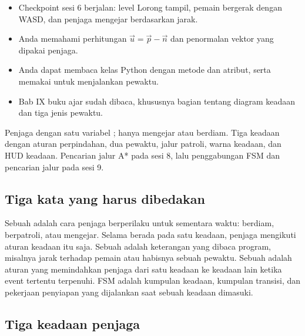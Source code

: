 
\begin{prasyaratbox}
\begin{itemize}[leftmargin=1.4em, itemsep=0.25em]
  \item Checkpoint sesi 6 berjalan: level Lorong tampil, pemain bergerak dengan
        WASD, dan penjaga mengejar berdasarkan jarak.
  \item Anda memahami perhitungan $\vec{u} = \vec{p} - \vec{n}$ dan
        penormalan vektor yang dipakai penjaga.
  \item Anda dapat membaca kelas Python dengan metode dan atribut, serta
        memakai  untuk menjalankan pewaktu.
  \item Bab IX buku ajar sudah dibaca, khususnya bagian tentang diagram
        keadaan dan tiga jenis pewaktu.
\end{itemize}
\end{prasyaratbox}


\petasesi
  {Penjaga dengan satu variabel ; hanya mengejar atau berdiam.}
  {Tiga keadaan dengan aturan perpindahan, dua pewaktu, jalur patroli, warna
   keadaan, dan HUD keadaan.}
  {Pencarian jalur A* pada sesi 8, lalu penggabungan FSM dan pencarian jalur
   pada sesi 9.}


\subsection*{Tiga kata yang harus dibedakan}

Sebuah  adalah cara penjaga berperilaku untuk sementara waktu:
berdiam, berpatroli, atau mengejar. Selama berada pada satu keadaan, penjaga
mengikuti aturan keadaan itu saja. Sebuah  adalah keterangan
yang dibaca program, misalnya jarak terhadap pemain atau habisnya sebuah
pewaktu. Sebuah  adalah aturan yang memindahkan penjaga
dari satu keadaan ke keadaan lain ketika event tertentu terpenuhi. FSM adalah
kumpulan keadaan, kumpulan transisi, dan pekerjaan penyiapan yang dijalankan
saat sebuah keadaan dimasuki.

\subsection*{Tiga keadaan penjaga}

